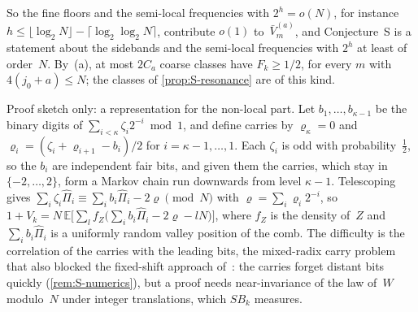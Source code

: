 So the fine floors and the semi-local frequencies with $2^h=o(N)$, for instance
$h\le\lfloor\log_2N\rfloor-\lceil\log_2\log_2N\rceil$, contribute $o(1)$ to~$\bar V^{(a)}_m$, and Conjecture~S is a statement
about the sidebands and the semi-local frequencies with $2^h$ at least of order~$N$. By~(a), at most $2C_a$ coarse classes have
$F_k\ge1/2$, for every $m$ with $4(j_0+a)\le N$; the classes of \cref{prop:S-resonance} are of this kind.

\begin{remark}\label{rem:S-carry}
Proof sketch only: a representation for the non-local part. Let $b_1,\dots,b_{\kappa-1}$ be the binary digits of
$\sum_{i<\kappa}\zeta_i2^{-i}\bmod1$, and define carries by $\varrho_\kappa=0$ and $\varrho_i=(\zeta_i+\varrho_{i+1}-b_i)/2$
for $i=\kappa-1,\dots,1$. Each $\zeta_i$ is odd with probability~$\frac12$, so the $b_i$ are independent fair bits, and
given them the carries, which stay in $\{-2,\dots,2\}$, form a Markov chain run downwards from level $\kappa-1$.
Telescoping gives $\sum_i\zeta_i\hat\Pi_i\equiv\sum_ib_i\hat\Pi_i-2\varrho\pmod N$ with $\varrho=\sum_i\varrho_i2^{-i}$,
so $1+V_k=N\,\mathbb E\bigl[\sum_lf_Z\bigl(\sum_ib_i\hat\Pi_i-2\varrho-lN\bigr)\bigr]$, where $f_Z$ is the density of~$Z$
and $\sum_ib_i\hat\Pi_i$ is a uniformly random valley position of the comb. The difficulty is the correlation of
the carries with the leading bits, the mixed-radix carry problem that also blocked the fixed-shift approach
of~\cite[Section~5.6]{BoundedNesting2026}: the carries forget distant bits quickly (\cref{rem:S-numerics}), but a proof
needs near-invariance of the law of~$W$ modulo~$N$ under integer translations, which $SB_k$ measures.
\end{remark}

